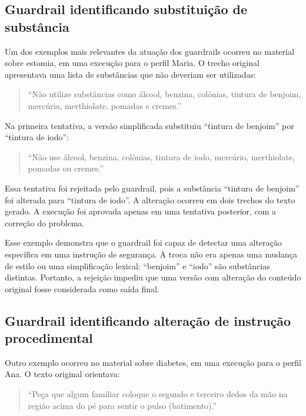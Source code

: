 \subsection{Guardrail identificando substituição de substância}
\label{subsec:guardrail-substituicao-substancia}

Um dos exemplos mais relevantes da atuação dos guardrails ocorreu no material sobre estomia, em uma execução para o perfil Maria. O trecho original apresentava uma lista de substâncias que não deveriam ser utilizadas:

\begin{quote}
``Não utilize substâncias como álcool, benzina, colônias, tintura de benjoim, mercúrio, merthiolate, pomadas e cremes.''
\end{quote}

Na primeira tentativa, a versão simplificada substituiu ``tintura de benjoim'' por ``tintura de iodo'':

\begin{quote}
``Não use álcool, benzina, colônias, tintura de iodo, mercúrio, merthiolate, pomadas ou cremes.''
\end{quote}

Essa tentativa foi rejeitada pelo guardrail, pois a substância ``tintura de benjoim'' foi alterada para ``tintura de iodo''. A alteração ocorreu em dois trechos do texto gerado. A execução foi aprovada apenas em uma tentativa posterior, com a correção do problema.

Esse exemplo demonstra que o guardrail foi capaz de detectar uma alteração específica em uma instrução de segurança. A troca não era apenas uma mudança de estilo ou uma simplificação lexical: ``benjoim'' e ``iodo'' são substâncias distintas. Portanto, a rejeição impediu que uma versão com alteração do conteúdo original fosse considerada como saída final.

\subsection{Guardrail identificando alteração de instrução procedimental}
\label{subsec:guardrail-alteracao-instrucao-procedimental}

Outro exemplo ocorreu no material sobre diabetes, em uma execução para o perfil Ana. O texto original orientava:

\begin{quote}
``Peça que algum familiar coloque o segundo e terceiro dedos da mão na região acima do pé para sentir o pulso (batimento).''
\end{quote}

